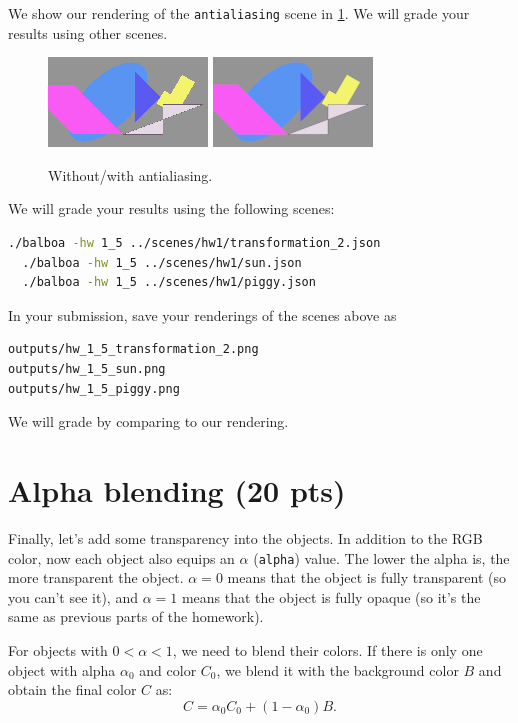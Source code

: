 We show our rendering of the \lstinline{antialiasing} scene in \cref{fig:hw1_5}. We will grade your results using other scenes.

\begin{figure}[ht]
    \centering
    \includegraphics[width=0.4\linewidth]{imgs/hw_1_5before.png}
    \includegraphics[width=0.4\linewidth]{imgs/hw_1_5after.png}
    \caption{Without/with antialiasing.}
    \label{fig:hw1_5}
\end{figure}

We will grade your results using the following scenes:
\begin{lstlisting}[language=bash]
  ./balboa -hw 1_5 ../scenes/hw1/transformation_2.json
  ./balboa -hw 1_5 ../scenes/hw1/sun.json
  ./balboa -hw 1_5 ../scenes/hw1/piggy.json
\end{lstlisting}
In your submission, save your renderings of the scenes above as
\begin{lstlisting}[language=bash]
outputs/hw_1_5_transformation_2.png
outputs/hw_1_5_sun.png
outputs/hw_1_5_piggy.png
\end{lstlisting}
We will grade by comparing to our rendering.

\section{Alpha blending (20 pts)}
Finally, let's add some transparency into the objects. In addition to the RGB color, now each object also equips an $\alpha$ (\lstinline{alpha}) value. The lower the alpha is, the more transparent the object. $\alpha=0$ means that the object is fully transparent (so you can't see it), and $\alpha=1$ means that the object is fully opaque (so it's the same as previous parts of the homework). 

For objects with $0 < \alpha < 1$, we need to blend their colors. If there is only one object with alpha $\alpha_0$ and color $C_0$, we blend it with the background color $B$ and obtain the final color $C$ as:
\begin{equation}
C = \alpha_0 C_0 + (1 - \alpha_0) B.
\end{equation}

